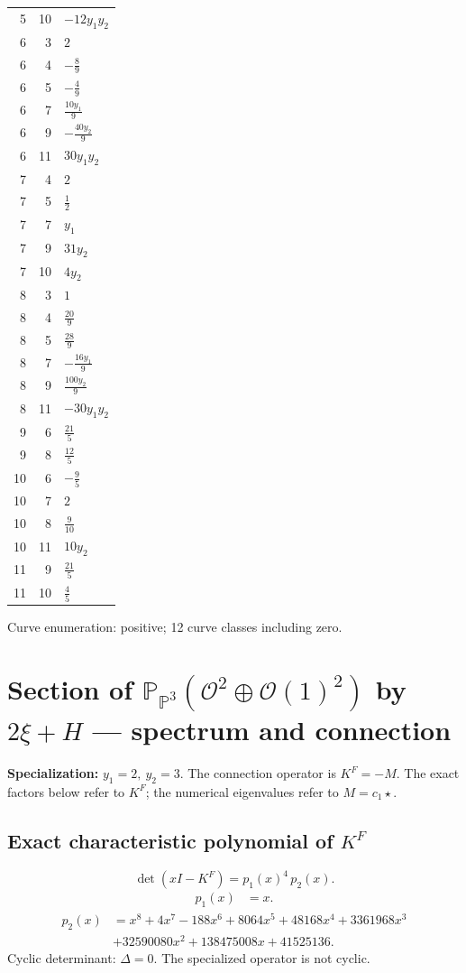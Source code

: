 \documentclass[10pt,a4paper]{article}
\begin{document}
{\begin{longtable}{rrp{125mm}}
5 & 10 & $- 12 y_{1} y_{2}$\\
6 & 3 & $2$\\
6 & 4 & $- \frac{8}{9}$\\
6 & 5 & $- \frac{4}{9}$\\
6 & 7 & $\frac{10 y_{1}}{9}$\\
6 & 9 & $- \frac{40 y_{2}}{9}$\\
6 & 11 & $30 y_{1} y_{2}$\\
7 & 4 & $2$\\
7 & 5 & $\frac{1}{2}$\\
7 & 7 & $y_{1}$\\
7 & 9 & $31 y_{2}$\\
7 & 10 & $4 y_{2}$\\
8 & 3 & $1$\\
8 & 4 & $\frac{20}{9}$\\
8 & 5 & $\frac{28}{9}$\\
8 & 7 & $- \frac{16 y_{1}}{9}$\\
8 & 9 & $\frac{100 y_{2}}{9}$\\
8 & 11 & $- 30 y_{1} y_{2}$\\
9 & 6 & $\frac{21}{5}$\\
9 & 8 & $\frac{12}{5}$\\
10 & 6 & $- \frac{9}{5}$\\
10 & 7 & $2$\\
10 & 8 & $\frac{9}{10}$\\
10 & 11 & $10 y_{2}$\\
11 & 9 & $\frac{21}{5}$\\
11 & 10 & $\frac{4}{5}$\\
\end{longtable}}
Curve enumeration: positive; 12 curve classes including zero.
\clearpage\section*{Section of $\mathbb P_{\mathbb P^{3}}(\mathcal O^{2}\oplus \mathcal O(1)^{2})$ by $2\xi +H$ --- spectrum and connection}
\textbf{Specialization:} $y_1=2,\ y_2=3$. The connection operator is $K^F=-M$. The exact factors below refer to $K^F$; the numerical eigenvalues refer to $M=c_1\star$.
\subsection*{Exact characteristic polynomial of $K^F$}
\[\det(xI-K^F)=p_{1}(x)^{4}\,p_{2}(x).\]
\[\begin{aligned}p_{1}(x)&=x.\end{aligned}\]
\[\begin{aligned}p_{2}(x)&=x^{8} + 4 x^{7} - 188 x^{6} + 8064 x^{5} + 48168 x^{4} + 3361968 x^{3}\\&+32590080 x^{2} + 138475008 x + 41525136.\end{aligned}\]
Cyclic determinant: $\Delta=0$. The specialized operator is not cyclic.
\end{document}
